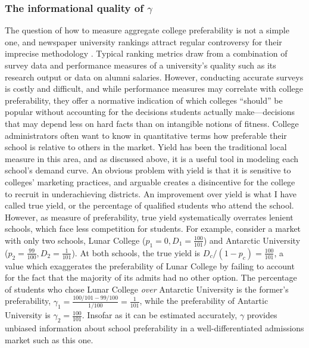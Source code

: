 \documentclass[12pt]{article}
\numberwithin{equation}{subsection}
\theoremstyle{definition}
\begin{document}
\subsubsection{The informational quality of $\gamma$}
The question of how to measure aggregate college preferability is not a simple one, and newspaper university rankings attract regular controversy for their imprecise methodology \parencite[][]{intlrankingsandconflicts}. Typical ranking metrics draw from a combination of survey data and performance measures of a university's quality such as its research output or data on alumni salaries. However, conducting accurate surveys is costly and difficult, and while performance measures may correlate with college preferability, they offer a normative indication of which colleges ``should'' be popular without accounting for the decisions students actually make---decisions that may depend less on hard facts than on intangible notions of fitness. College administrators often want to know in quantitative terms how preferable their school is relative to others in the market. Yield has been the traditional local measure in this area, and as discussed above, it is a useful tool in modeling each school's demand curve. An obvious problem with yield is that it is sensitive to colleges' marketing practices, and arguable creates a disincentive for the college to recruit in underachieving districts. An improvement over yield is what I have called true yield, or the percentage of qualified students who attend the school. However, as measure of preferability, true yield systematically overrates lenient schools, which face less competition for students. For example, consider a market with only two schools, Lunar College ($p_1 = 0, D_1 =  \frac{100}{101}$) and Antarctic University ($p_2 = \frac{99}{100}, D_2 = \frac{1}{101}$). At both schools, the true yield is $D_c / (1 - p_c) = \frac{100}{101}$, a value which exaggerates the preferability of Lunar College by failing to account for the fact that the majority of its admits had no other option. The percentage of students who chose Lunar College \emph{over} Antarctic University is the former's preferability, $\gamma_1 = \frac{100/101 - 99/100}{1/100} = \frac{1}{101}$, while the preferability of Antartic University is $\gamma_2 = \frac{100}{101}$. Insofar as it can be estimated accurately, $\gamma$ provides unbiased information about school preferability in a well-differentiated admissions market such as this one. 
\end{document}
